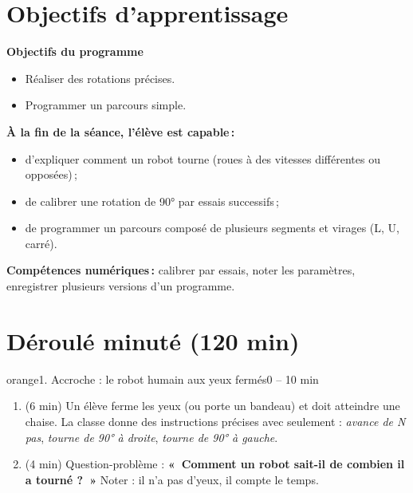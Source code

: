 \documentclass[11pt,a4paper]{article}
\begin{document}
\section{Objectifs d'apprentissage}
\begin{tcolorbox}[colback=gray!8,colframe=gray!60!black,arc=1mm,boxrule=0.5pt]
\textbf{Objectifs du programme}
\begin{itemize}
 \item Réaliser des rotations précises.
 \item Programmer un parcours simple.
\end{itemize}
\textbf{À la fin de la séance, l'élève est capable\,:}
\begin{itemize}
 \item d'expliquer comment un robot tourne (roues à des vitesses différentes ou opposées)\,;
 \item de calibrer une rotation de 90° par essais successifs\,;
 \item de programmer un parcours composé de plusieurs segments et virages (L, U, carré).
\end{itemize}
\textbf{Compétences numériques\,:} calibrer par essais, noter les paramètres, enregistrer plusieurs versions d'un programme.
\end{tcolorbox}

\section{Déroulé minuté (120 min)}

\begin{etape}{orange}{1. Accroche : le robot humain aux yeux fermés}{0 -- 10 min}
\begin{enumerate}
 \item (6 min) Un élève ferme les yeux (ou porte un bandeau) et doit atteindre une chaise. La classe donne des instructions précises avec seulement : \emph{avance de N pas}, \emph{tourne de 90° à droite}, \emph{tourne de 90° à gauche}.
 \item (4 min) Question-problème : \textbf{«~Comment un robot sait-il de combien il a tourné ?~»} Noter : il n'a pas d'yeux, il compte le temps.
\end{enumerate}
\end{etape}
\end{document}
